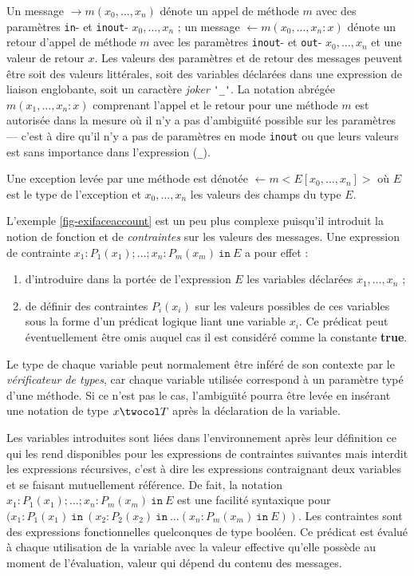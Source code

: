Un message  $\rightarrow m(x_0,\dots,x_n)$ d\'enote un appel
de m\'ethode $m$ avec des param\`etres \texttt{in}- et \texttt{inout}- $x_0,\dots,x_n$ ;
un message $\leftarrow m(x_0,\dots,x_n:x)$ d\'enote un retour d'appel de
m\'ethode $m$ avec les param\`etres \texttt{inout}- et \texttt{out}- $x_0,\dots,x_n$ et
une valeur de retour $x$.  Les valeurs des param\`etres et de
retour des messages peuvent \^etre soit des valeurs litt\'erales, soit des
variables d\'eclar\'ees dans une expression de liaison englobante, soit un
caract\`ere \emph{joker} \verb+'_'+. La
notation abr\'eg\'ee $m(x_1,\dots,x_n:x)$ comprenant l'appel et le retour
pour une m\'ethode $m$ est autoris\'ee dans la mesure o\`u il n'y a
pas d'ambigu\"{\i}t\'e  possible sur les param\`etres --- c'est \`a
dire qu'il n'y a pas de param\`etres en mode \texttt{inout} ou que
leurs valeurs est sans importance dans l'expression (\verb+_+).

Une exception lev\'ee par une m\'ethode est d\'enot\'ee  $\leftarrow
m<E[x_0,\dots,x_n]>$ o\`u $E$ est le type de l'exception et
$x_0,\dots,x_n$ les valeurs des champs du type $E$.

L'exemple \ref{fig-exifaceaccount} est un peu plus complexe puisqu'il introduit
la notion de fonction et de \emph{contraintes} sur les valeurs des messages.
Une expression de contrainte $x_1:P_1(x_1);\dots;x_n:P_m(x_m)\ \mathtt{in}\ E$
a pour effet :
\begin{enumerate}
  \item d'introduire dans la port\'ee de l'expression $E$ les variables
  d\'eclar\'ees $x_1,\dots,x_n$  ;
\item de d\'efinir des contraintes $P_i(x_i)$ sur les valeurs possibles de ces
  variables sous la forme d'un pr\'edicat logique liant une variable
  $x_i$. Ce pr\'edicat peut \'eventuellement \^etre omis auquel cas
  il est consid\'er\'e comme la constante \textbf{true}.
\end{enumerate}
Le type de chaque variable peut normalement \^etre inf\'er\'e de
son contexte par le \emph{v\'erificateur de types}, car chaque
variable utilis\'ee correspond \`a un param\`etre typ\'e d'une m\'ethode. Si ce n'est pas
le cas, l'ambigu\"{\i}t\'e pourra \^etre lev\'ee en ins\'erant une
notation de type $x\twocol T$ apr\`es la d\'eclaration de la variable. 

Les variables introduites sont li\'ees dans l'environnement apr\`es
leur d\'efinition ce qui les rend disponibles pour les expressions de
contraintes suivantes mais interdit les expressions r\'ecursives,
c'est \`a dire les expressions contraignant deux  variables et se
faisant mutuellement r\'ef\'erence. De
fait, la notation  $x_1:P_1(x_1);\dots;x_n:P_m(x_m)\ \mathtt{in}\ E$
est une facilit\'e syntaxique pour $(x_1:P_1(x_1)\ \mathtt{in}\
(x_2:P_2(x_2) \ \mathtt{in}\ \dots (x_n:P_m(x_m)\ \mathtt{in}\ E))$.
Les contraintes sont des expressions fonctionnelles quelconques de
type bool\'een. 
Ce pr\'edicat est \'evalu\'e \`a chaque utilisation de la
variable avec la valeur effective qu'elle poss\`ede au moment de
l'\'evaluation, valeur qui d\'epend du contenu des
messages. 

